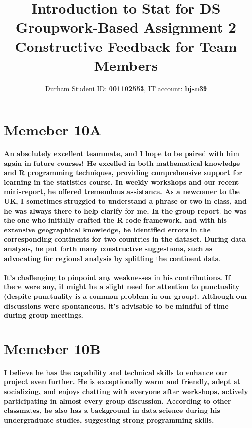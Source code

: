 \documentclass[11pt]{article} %
\title{Introduction to Stat for DS Groupwork-Based Assignment 2 \\ Constructive Feedback for Team Members}
\author{Durham Student ID: \textbf{001102553}, IT account: \textbf{bjsn39}}
\begin{document}
\maketitle
% 
% 
% 
\section{Memeber 10A}
% 
% 
\paragraph{An absolutely excellent teammate, and I hope to be paired with him again in future courses! He excelled in both mathematical knowledge and R programming techniques, providing comprehensive support for learning in the statistics course. In weekly workshops and our recent mini-report, he offered tremendous assistance. As a newcomer to the UK, I sometimes struggled to understand a phrase or two in class, and he was always there to help clarify for me. In the group report, he was the one who initially crafted the R code framework, and with his extensive geographical knowledge, he identified errors in the corresponding continents for two countries in the dataset. During data analysis, he put forth many constructive suggestions, such as advocating for regional analysis by splitting the continent data.}
\paragraph{It's challenging to pinpoint any weaknesses in his contributions. If there were any, it might be a slight need for attention to punctuality (despite punctuality is a common problem in our group). Although our discussions were spontaneous, it's advisable to be mindful of time during group meetings.}
% 
% 
\section{Memeber 10B}
% 
\paragraph{I believe he has the capability and technical skills to enhance our project even further. He is exceptionally warm and friendly, adept at socializing, and enjoys chatting with everyone after workshops, actively participating in almost every group discussion. According to other classmates, he also has a background in data science during his undergraduate studies, suggesting strong programming skills.}
% 
% 
\end{document}
